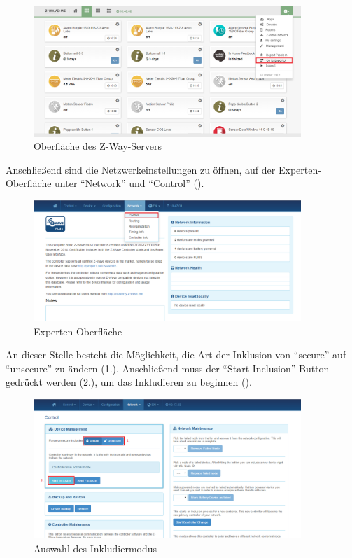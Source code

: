 \begin{figure}[h!]
	\centering
	\includegraphics[width=0.9\textwidth]{img/Sensorevaluation/PhilioConf2.png}
	\caption{Oberfläche des Z-Way-Servers}
	\label{fig:sensorenPhilioConf2}
\end{figure}

Anschließend sind die Netzwerkeinstellungen zu öffnen, auf der Experten-Oberfläche  unter "`Network"' und "`Control"' ().

\begin{figure}[h!]
	\centering
	\includegraphics[width=0.9\textwidth]{img/Sensorevaluation/PhilioConf3.png}
	\caption{Experten-Oberfläche}
	\label{fig:sensorenPhilioConf3}
\end{figure}

An dieser Stelle besteht die Möglichkeit, die Art der Inklusion von "`secure"' auf "`unsecure"' zu ändern (1.). Anschließend muss der "`Start Inclusion"'-Button gedrückt werden (2.), um das Inkludieren zu beginnen (). 

\begin{figure}[h!]
	\centering
	\includegraphics[width=0.9\textwidth]{img/Sensorevaluation/PhilioConf4.png}
	\caption{Auswahl des Inkludiermodus}
	\label{fig:sensorenPhilioConf4}
\end{figure}

